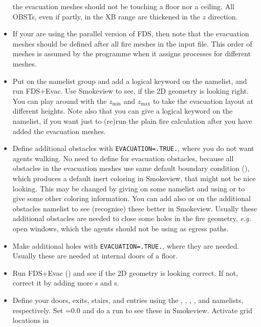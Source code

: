 \documentclass[12pt,a4paper,final,twoside]{stylevk}
\begin{document}
\begin{itemize}
  the evacuation meshes should not be touching a floor nor a ceiling.
  All OBSTs, even if partly, in the XB range are thickened in the $z$
  direction.
%
\item If your are using the parallel version of FDS, then note that
  the evacuation meshes should be defined after all fire meshes in the
  input file.  This order of meshes is assumed by the programme when
  it assigns processes for different meshes.
%
\item Put  on the  namelist group and
  add a logical keyword  on the
   namelist, and run FDS+Evac.  Use Smokeview to see, if
  the 2D geometry is looking right.  You can play around with the
  $z_\mathrm{min}$ and $z_\mathrm{max}$ to take the evacuation layout
  at different heights.  Note also that you can give a logical keyword
   on the  namelist, if you
  want just to (re)run the plain fire calculation after you have added
  the evacuation meshes.
%
\item Define additional obstacles with \verb|EVACUATION=.TRUE.|, where
  you do not want agents walking.  No need to define 
  for evacuation obstacles, because all obstacles in the evacuation
  meshes use same default boundary condition (), which
  produces a default inert coloring in Smokeview, that might not be
  nice looking.  This may be changed by giving 
  on some  namelist and using  or 
  to give some other coloring information.  You can add also
   or  on the additional obstacles namelist to
  see (recognise) these better in Smokeview.  Usually these additional
  obstacles are needed to close some holes in the fire geometry,
  \emph{e.g.}  open windows, which the agents should not be using as
  egress paths.
%
\item Make additional holes with \verb|EVACUATION=.TRUE.|, where they
  are needed.  Usually these are needed at internal doors of a floor.
%
\item Run FDS+Evac () and see if the 2D geometry is
  looking correct.  If not, correct it by adding more s
  and s.
%
\item Define your doors, exits, stairs, and entries using the
  , , , , and
   namelists, respectively.  Set =0.0 and do
  a run to see these in Smokeview.  Activate grid locations in

\end{itemize}
\end{document}
